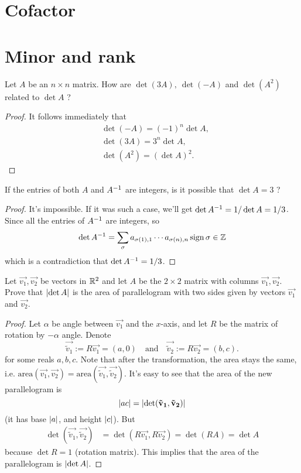 \documentclass{article}
\begin{document}
\section{Cofactor}
\section{Minor and rank}

\setcounter{exercise}{1}
\begin{exercise}
  Let $A$ be an $n\times n$ matrix. How are $\det(3A),~\det(-A)$
  and $\det(A^2)$ related to $\det A$ ?
\end{exercise}
\begin{proof}
  It follows immediately that 
  \begin{align*}
    &\det(-A)=(-1)^n\det A,\\
    &\det(3A)=3^n\det A,\\
    &\det(A^2)=(\det A)^2.
  \end{align*}
\end{proof}
\begin{exercise}
  If the entries of both $A$ and $A^{-1}$ are integers,
  is it possible that $\det A=3$ ?
\end{exercise}
\begin{proof}
  It's impossible. If it was such a case, we'll get 
  $\det A^{-1}=1/\det A=1/3$. Since all the entries of $A^{-1}$ are
  integers, so
  \[
    \det A\inv=\sum_{\sigma}a_{\sigma(1),1}\cdots 
    a_{\sigma(n),n}\sign\sigma\in\Z
  \]
  which is a contradiction that $\det A^{-1}=1/3$.
\end{proof}
\begin{exercise}
  Let $\vec{v_1},\vec{v_2}$ be vectors in $\R^2$ and let $A$ be the
  $2\times 2$ matrix with columns $\vec{v_1},\vec{v_2}$. Prove that
  $\lvert\det A\rvert$ is the area of parallelogram with two sides given by
  vectors $\vec{v_1}$ and $\vec{v_2}$.
\end{exercise}
\begin{proof}
  Let $\alpha$ be angle between $\vec{v_1}$ and the $x$-axis, and
  let $R$ be the matrix of rotation by $-\alpha$ angle. Denote
  \[
    \vec{\tilde{v}_1}:=R\vec{v_1}=(a,0)\quad\text{and}\quad
    \vec{\tilde{v}_2}:=R\vec{v_2}=(b,c).
  \]
  for some reals $a,b,c$. 
  Note that after the transformation, the area stays the same, i.e.
  $\mathrm{area}(\vec{v_1},\vec{v_2})
  =\mathrm{area}(\vec{\tilde{v}_1},\vec{\tilde{v}_2})$. It's easy 
  to see that the area of the new parallelogram is 
  \[\lvert ac\rvert=\lvert\det (\mathbf{\tilde{v}_1},\mathbf{\tilde{v}_2})\rvert\]
  (it has  base $\lvert a\rvert$, and height $\lvert c\rvert$). But
  \begin{align*}
    \det(\vec{\tilde{v}_1},\vec{\tilde{v}_2})
    &=\det(R\vec{v_1}, R\vec{v_2})=\det(RA)=\det A
  \end{align*}
  because $\det R=1$ (rotation matrix). This implies that the area of
  the parallelogram is $\lvert\det A\rvert$.
\end{proof}
\end{document}
